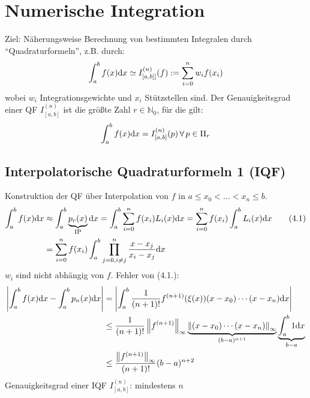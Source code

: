 \section{Numerische Integration}
Ziel: Näherungsweise Berechnung von bestimmten Integralen
durch ``Quadraturformeln'', z.B. durch:
\begin{align*}
  \int_a^b f(x) \mathrm{d}x \simeq I_{[a,b]]}^{(n)}(f) := \sum\limits_{i=0}^{n}{w_i f(x_i)}
\end{align*}
wobei $w_i$ Integrationsgewichte und $x_i$ Stützstellen sind.
 Der Genauigkeitsgrad einer QF $I_{[a,b]}^{(n)}$ ist
die größte Zahl $r \in \mathbb{N}_0$, für die gilt:
\begin{align*}
  \int_a^b f(x) \mathrm{d}x = I_{[a,b]}^{(n)}(p)\,\forall\,p \in \Pi_r
\end{align*}

\subsection{Interpolatorische Quadraturformeln 1 (IQF)}
Konstruktion der QF über Interpolation von $f$ in $a \leq x_0 < \ldots < x_n \leq b$.
\begin{align*}
  \int_a^b f(x) \mathrm{d}x &\approx \int_a^b \underbrace{p_r(x)}_{\text{IP}} \mathrm{d}x = 
  \int_a^b \sum\limits_{i=0}^{n}{f(x_i)L_i(x)\mathrm{d}x} = \sum\limits_{i=0}^{n}{f(x_i) \int_a^b L_i(x)\mathrm{d}x} \tag{4.1}\\
  &= \sum\limits_{i=0}^{n}{f(x_i) \int_a^b \prod_{j=0,i\neq j}^n \frac{x-x_j}{x_i - x_j}\mathrm{d}x}
\end{align*}
$w_i$ sind nicht abhängig von $f$. Fehler von (4.1.):
\begin{align*}
  \left| \int_a^b f(x)\mathrm{d}x - \int_a^b p_n(x)\mathrm{d}x \right| &= \left|  \int_a^b \frac{1}{(n+1)!} f^{(n+1)}(\xi(x))(x-x_0)\cdots(x-x_n)\mathrm{d}x \right|\\
  &\leq \frac{1}{(n+1)!} \left\lVert f^{(n+1)} \right\rVert_\infty \underbrace{\left\lVert (x-x_0)\cdots(x-x_n) \right\rVert_\infty}_{(b-a)^{n+1}} \underbrace{\int_a^b 1 \mathrm{d}x}_{b-a}\\
  &\leq \frac{\left\lVert f^{(n+1)} \right\rVert_\infty}{(n+1)!}(b-a)^{n+2}
\end{align*}
Genauigkeitsgrad einer IQF $I_{[a,b]}^{(n)}$: mindestens $n$

